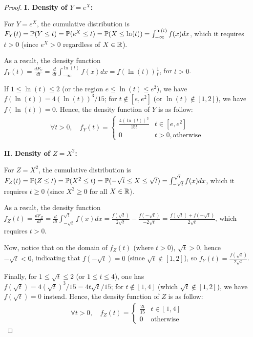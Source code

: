 \documentclass{article}
\begin{document}
\begin{proof}

    \hfil

    \textbf{I. Density of $Y=e^X$:}

    For $Y=e^X$, the cumulative distribution is $F_Y(t) = \mathbb{P}(Y\leq t)=\mathbb{P}(e^X\leq t) = \mathbb{P}(X\leq \ln(t)) = \int_{-\infty}^{\ln(t)}f(x)dx$, which it requires $t>0$ (since $e^X>0$ regardless of $X \in\mathbb{R}$).
        
    As a result, the density function $f_Y(t) = \frac{dF_Y}{dt} = \frac{d}{dt}\int_{-\infty}^{\ln(t)}f(x)dx = f(\ln(t))\frac{1}{t}$, for $t>0$.

    If $1\leq \ln(t)\leq 2$ (or the region $e\leq \ln(t)\leq e^2$), we have $f(\ln(t)) = 4(\ln(t))^3/15$; for $t\notin [e,e^2]$ (or $\ln(t)\notin [1,2]$), we have $f(\ln(t))=0$. Hence, the density function of $Y$ is as follow:
    \begin{align}
        \forall t>0, \quad f_Y(t) = \begin{cases}
            \frac{4(\ln(t))^3}{15t} & t \in[e,e^2]\\
            0 & t>0, \text{otherwise}
        \end{cases}
    \end{align}

    \hfil

    \textbf{II. Density of $Z=X^2$:}

    For $Z=X^2$, the cumulative distribution is $F_Z(t)=\mathbb{P}(Z\leq t)=\mathbb{P}(X^2\leq t)=\mathbb{P}(-\sqrt{t}\leq X\leq \sqrt{t}) = \int_{-\sqrt{t}}^{\sqrt{t}}f(x)dx$, which it requires $t\geq 0$ (since $X^2\geq 0$ for all $X\in\mathbb{R}$).

    As a result, the density function $f_Z(t)=\frac{dF_Z}{dt}=\frac{d}{dt}\int_{-\sqrt{t}}^{\sqrt{t}}f(x)dx = \frac{f(\sqrt{t})}{2\sqrt{t}} - \frac{f(-\sqrt{t})}{-2\sqrt{t}} = \frac{f(\sqrt{t})+f(-\sqrt{t})}{2\sqrt{t}}$, which requires $t>0$.

    Now, notice that on the domain of $f_Z(t)$ (where $t>0$), $\sqrt{t}>0$, hence $-\sqrt{t}<0$, indicating that $f(-\sqrt{t})=0$ (since $\sqrt{t}\notin [1,2]$), so $f_Y(t) = \frac{f(\sqrt{t})}{2\sqrt{t}}$.

    Finally, for $1\leq \sqrt{t}\leq 2$ (or $1\leq t\leq 4$), one has $f(\sqrt{t})=4(\sqrt{t})^3/15 = 4t\sqrt{t}/15$; for $t\notin[1,4]$ (which $\sqrt{t}\notin [1,2]$), we have $f(\sqrt{t})=0$ instead. Hence, the density function of $Z$ is as follow:
    \begin{align}
        \forall t>0, \quad f_Z(t)=\begin{cases}
            \frac{2t}{15} & t\in[1,4]\\
            0 & \text{otherwise}
        \end{cases}
    \end{align}


\end{proof}
\end{document}
